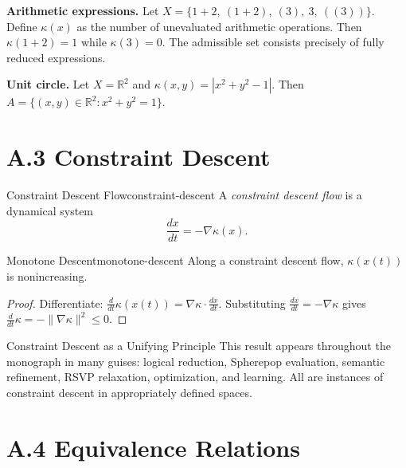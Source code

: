 \begin{example}
  \textbf{Arithmetic expressions.} Let
  $X = \{ 1{+}2,\ (1{+}2),\ (3),\ 3,\ ((3)) \}$.
  Define $\kappa(x)$ as the number of unevaluated arithmetic operations.
  Then $\kappa(1{+}2) = 1$ while $\kappa(3) = 0$.
  The admissible set consists precisely of fully reduced expressions.
\end{example}

\begin{example}
  \textbf{Unit circle.} Let $X = \mathbb{R}^2$ and
  $\kappa(x,y) = |x^2 + y^2 - 1|$.
  Then $A = \{(x,y) \in \mathbb{R}^2 : x^2 + y^2 = 1\}$.
\end{example}

\section*{A.3 Constraint Descent}

\begin{definition}{Constraint Descent Flow}{constraint-descent}
  A \emph{constraint descent flow} is a dynamical system
  \[
    \frac{dx}{dt} = -\nabla\kappa(x).
  \]
\end{definition}

\begin{proposition}{Monotone Descent}{monotone-descent}
  Along a constraint descent flow, $\kappa(x(t))$ is nonincreasing.
\end{proposition}

\begin{proof}
  Differentiate:
  $\frac{d}{dt}\kappa(x(t)) = \nabla\kappa \cdot \frac{dx}{dt}$.
  Substituting $\frac{dx}{dt} = -\nabla\kappa$ gives
  $\frac{d}{dt}\kappa = -\|\nabla\kappa\|^2 \leq 0$.
\end{proof}

\begin{conceptaside}{Constraint Descent as a Unifying Principle}
  This result appears throughout the monograph in many guises:
  logical reduction, Spherepop evaluation, semantic refinement,
  RSVP relaxation, optimization, and learning. All are instances of
  constraint descent in appropriately defined spaces.
\end{conceptaside}

\section*{A.4 Equivalence Relations}

